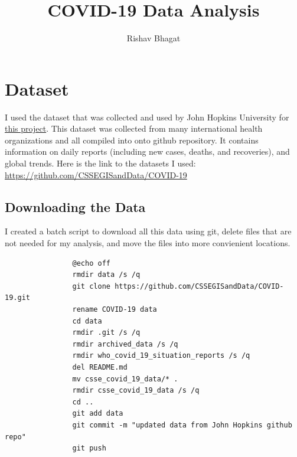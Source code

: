 \documentclass{article}
\title{COVID-19 Data Analysis}
\author{Rishav Bhagat}
\begin{document}
    \maketitle
    \section{Dataset}
        I used the dataset that was collected and used by John Hopkins University for 
        \href{https://www.arcgis.com/apps/opsdashboard/index.html#/bda7594740fd40299423467b48e9ecf6}{this project}. 
        This dataset was collected from many international health organizations and all compiled into onto github repository. 
        It contains information on daily reports (including new cases, deaths, and recoveries), and global trends. 
        \newline \indent
        Here is the link to the datasets I used: 
        \newline\indent\indent \href{https://github.com/CSSEGISandData/COVID-19}{https://github.com/CSSEGISandData/COVID-19}
        \subsection{Downloading the Data}
            I created a batch script to download all this data using git, delete files that are not needed for my analysis, and move the files into more convienient locations.
            \begin{lstlisting}
                @echo off
                rmdir data /s /q
                git clone https://github.com/CSSEGISandData/COVID-19.git
                rename COVID-19 data
                cd data
                rmdir .git /s /q
                rmdir archived_data /s /q
                rmdir who_covid_19_situation_reports /s /q
                del README.md
                mv csse_covid_19_data/* .
                rmdir csse_covid_19_data /s /q
                cd ..
                git add data
                git commit -m "updated data from John Hopkins github repo"
                git push
            \end{lstlisting}
\end{document}
